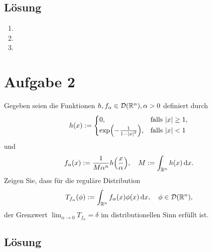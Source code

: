 \documentclass{exercise}
\begin{document}
    \subsection*{Lösung}
    \begin{enumerate}
        \item
        \item
        \item
    \end{enumerate}


    \section*{Aufgabe 2}
    
    \begin{problem}
        Gegeben seien die Funktionen \(h, f_\alpha \in \mathcal{D}\parentheses*{\R^n}, \alpha > 0\) definiert durch
        \[
            h\parentheses*{x} := \begin{cases}
                0, & \text{falls }\absolute*{x} \ge 1,\\
                \exp\parentheses*{-\frac{1}{1 - \absolute*{x}^2}}, & \text{falls }\absolute*{x} < 1
            \end{cases}
        \]
        und
        \[
            f_\alpha\parentheses*{x} := \frac{1}{M\alpha^n}h\parentheses*{\frac{x}{\alpha}}, \quad M := \int_{\R^n}h\parentheses*{x}\d x.
        \]
        Zeigen Sie, dass für die reguläre Distribution
        \[
            T_{f_\alpha}\parentheses*{\phi} := \int_{\R^n}f_\alpha\parentheses*{x}\phi\parentheses*{x}\d x, \quad \phi \in \mathcal{D}\parentheses*{\R^n},
        \]
        der Grenzwert \(\lim_{\alpha \to 0}T_{f_\alpha} = \delta\) im distributionellen Sinn erfüllt ist.
    \end{problem}
    
    \subsection*{Lösung}
\end{document}
